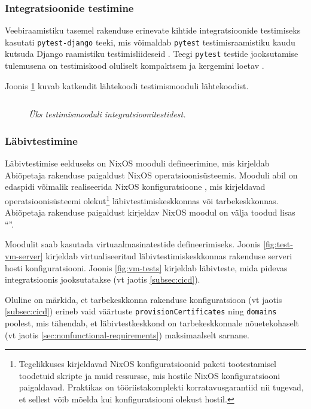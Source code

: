 \subsubsection{Integratsioonide testimine}

Veebiraamistiku tasemel rakenduse erinevate kihtide integratsioonide testimiseks kasutati \texttt{pytest-django} teeki, mis võimaldab
\texttt{pytest} testimisraamistiku kaudu kutsuda Django raamistiku testimisliideseid \cite{pytest-django-usage}. Teegi \texttt{pytest} testide jooksutamise tulemusena on testimiskood oluliselt kompaktsem ja kergemini loetav \cite{pytest-django-why}.

Joonis \ref{fig:pytest} kuvab katkendit lähtekoodi testimismooduli lähtekoodist.

\begin{figure}
\inputminted[breaklines]{py}{chapters/data/test.py}
\caption{\emph{Üks testimismooduli integratsioonitestidest.}}\label{fig:pytest}
\end{figure}

\subsubsection{Läbivtestimine}\label{subsubsec:e2etests}

\newcommand{\stateActually}{Tegelikkuses kirjeldavad NixOS konfiguratsioonid paketi tootestamisel toodetuid skripte ja muid ressursse, mis hostile NixOS konfiguratsiooni paigaldavad. Praktikas on tööriistakomplekti korratavusgarantiid nii tugevad, et sellest võib mõelda kui konfiguratsiooni olekust hostil.}

Läbivtestimise eelduseks on NixOS mooduli defineerimine, mis kirjeldab Abiõpetaja rakenduse paigaldust NixOS operatsioonisüsteemis. Mooduli abil on edaspidi võimalik realiseerida NixOS konfiguratsioone \cite{nixos-configuration}, mis kirjeldavad operatsioonisüsteemi olekut\footnote{\stateActually} läbivtestimiskeskkonnas või tarbekeskkonnas. Abiõpetaja rakenduse paigaldust kirjeldav NixOS moodul on välja toodud lisas ``''.

Moodulit saab kasutada virtuaalmasinatestide defineerimiseks. Joonis \ref{fig:test-vm-server} kirjeldab virtualiseeritud läbivtestimiskeskkonnas rakenduse serveri hosti konfiguratsiooni. Joonis \ref{fig:vm-tests} kirjeldab läbivteste, mida pidevas integratsioonis jooksutatakse (vt jaotis \ref{subsec:cicd}).

Oluline on märkida, et tarbekeskkonna rakenduse konfiguratsioon (vt jaotis \ref{subsec:cicd}) erineb vaid väärtuste \texttt{provisionCertificates} ning \texttt{domains} poolest, mis tähendab, et läbivtestkeskkond on tarbekeskkonnale nõuetekohaselt (vt jaotis \ref{sec:nonfunctional-requirements}) maksimaalselt sarnane.

